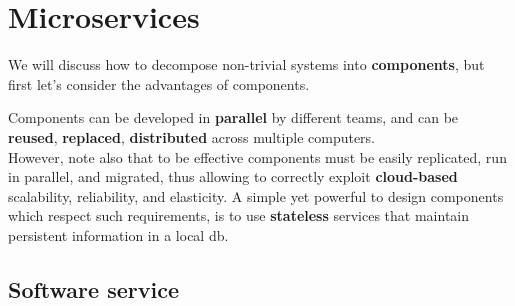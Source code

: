 \chapter{Microservices}

We will discuss how to decompose non-trivial systems into \textbf{components},
but first let's consider the advantages of components.

Components can be developed in \textbf{parallel} by different teams, and can be \textbf{reused}, \textbf{replaced}, \textbf{distributed} across multiple computers.\\
However, note also that to be effective components must be easily replicated, run in parallel, and migrated,
thus allowing to correctly exploit \textbf{cloud-based} scalability, reliability, and elasticity.
A simple yet powerful to design components which respect such requirements,
is to use \textbf{stateless} services that maintain persistent information in a local db.

\section{Software service}

